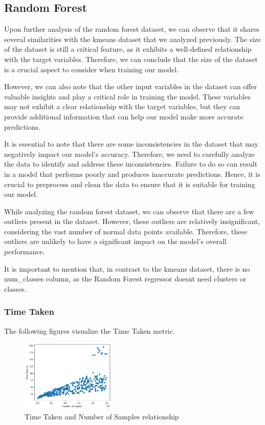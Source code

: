 \documentclass[conference]{IEEEtran}
\begin{document}
\subsection{Random Forest}

Upon further analysis of the random forest dataset, we can observe that it shares several similarities with the kmeans dataset that we analyzed previously. The size of the dataset is still a critical feature, as it exhibits a well-defined relationship with the target variables. Therefore, we can conclude that the size of the dataset is a crucial aspect to consider when training our model.

However, we can also note that the other input variables in the dataset can offer valuable insights and play a critical role in training the model. These variables may not exhibit a clear relationship with the target variables, but they can provide additional information that can help our model make more accurate predictions.

It is essential to note that there are some inconsistencies in the dataset that may negatively impact our model's accuracy. Therefore, we need to carefully analyze the data to identify and address these inconsistencies. Failure to do so can result in a model that performs poorly and produces inaccurate predictions. Hence, it is crucial to preprocess and clean the data to ensure that it is suitable for training our model.

While analyzing the random forest dataset, we can observe that there are a few outliers present in the dataset. However, these outliers are relatively insignificant, considering the vast number of normal data points available. Therefore, these outliers are unlikely to have a significant impact on the model's overall performance.



It is important to mention that, in contrast to the kmeans dataset, there is no num\_classes column, as the Random Forest regressor doesnt need clusters or classes.

\subsubsection{\textbf{Time Taken}}
 The following figures visualize the Time Taken metric.
\begin{figure}[ht]
    \centering
  \includegraphics[width=0.4\textwidth]{plots/experiment_results/random_forest_time_samples.pdf}
    \caption{Time Taken and Number of Samples relationship}
  \end{figure}
  
\end{document}
